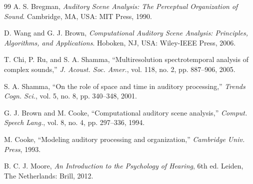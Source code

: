 \documentclass[conference]{IEEEtran}
\begin{document}
\begin{thebibliography}{99}
A. S. Bregman, \emph{Auditory Scene Analysis: The Perceptual Organization of Sound}. Cambridge, MA, USA: MIT Press, 1990.

D. Wang and G. J. Brown, \emph{Computational Auditory Scene Analysis: Principles, Algorithms, and Applications}. Hoboken, NJ, USA: Wiley-IEEE Press, 2006.

T. Chi, P. Ru, and S. A. Shamma, ``Multiresolution spectrotemporal analysis of complex sounds,'' \emph{J. Acoust. Soc. Amer.}, vol. 118, no. 2, pp. 887--906, 2005.

S. A. Shamma, ``On the role of space and time in auditory processing,'' \emph{Trends Cogn. Sci.}, vol. 5, no. 8, pp. 340--348, 2001.

G. J. Brown and M. Cooke, ``Computational auditory scene analysis,'' \emph{Comput. Speech Lang.}, vol. 8, no. 4, pp. 297--336, 1994.

M. Cooke, ``Modeling auditory processing and organization,'' \emph{Cambridge Univ. Press}, 1993.

B. C. J. Moore, \emph{An Introduction to the Psychology of Hearing}, 6th ed. Leiden, The Netherlands: Brill, 2012.
\end{thebibliography}

\balance
\end{document}
